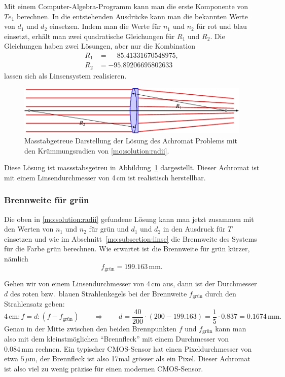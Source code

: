 Mit einem Computer-Algebra-Programm kann man die erste Komponente von $Te_1$ 
berechnen.
In die entstehenden Ausdrücke kann man die bekannten Werte von
$d_1$ und $d_2$ einsetzen.
Indem man die Werte für $n_1$ und $n_2$ für rot und blau einsetzt, 
erhält man zwei quadratische Gleichungen für $R_1$ und $R_2$.
Die Gleichungen haben zwei Lösungen, aber nur die Kombination
\begin{equation}
\begin{aligned}
R_1&=\phantom{-} 85.41331670548975,
\\
R_2&=-95.89206695802633
\end{aligned}
\label{mo:solution:radii}
\end{equation}
lassen sich als Linsensystem realisieren.
\begin{figure}
\centering
\includegraphics[width=\hsize]{applications/matrixoptik/solution.pdf}
\caption{Masstabgetreue Darstellung der Lösung des Achromat Problems
mit den Krümmungsradien von
\eqref{mo:solution:radii}.
\label{mo:solution:image}}
\end{figure}
Diese Lösung ist massstabsgetreu in Abbildung~\ref{mo:solution:image}
dargestellt.
Dieser Achromat ist mit einem Linsendurchmesser von 4\,cm ist realistisch
herstellbar.

\subsubsection{Brennweite für grün}
Die oben in \eqref{mo:solution:radii} gefundene Lösung kann man jetzt
zusammen mit den Werten von $n_1$ und $n_2$ für grün und $d_1$ und $d_2$
in den Ausdruck für $T$ einsetzen und wie im
Abschnitt~\ref{mo:subsection:linse} die Brennweite des Systems für die
Farbe grün berechnen.
Wie erwartet ist die Brennweite für grün kürzer, nämlich
\[
f_{\text{grün}} = 199.163\,\text{mm}.
\]

Gehen wir von einem Linsendurchmesser von 4\,cm aus, dann ist der Durchmesser
$d$
des roten bzw.~blauen Strahlenkegels bei der Brennweite $f_{\text{grün}}$
durch den Strahlensatz geben:
\[
4\,\text{cm} : f = d : (f - f_{\text{grün}})
\qquad \Rightarrow \qquad
d = \frac{40}{200}\cdot (200-199.163) = \frac15\cdot 0.837 = 0.1674\,\text{mm}.
\]
Genau in der Mitte zwischen den beiden Brennpunkten $f$ und $f_{\text{grün}}$
kann man also mit dem kleinstmöglichen ``Brennfleck'' mit einem Durchmesser
von $0.084\,\text{mm}$ rechnen.
Ein typischer CMOS-Sensor hat einen Pixeldurchmesser von etwa $5\,\mu\text{m}$,
der Brennfleck ist also 17mal grösser als ein Pixel.
Dieser Achromat ist also viel zu wenig präzise für einen modernen CMOS-Sensor.





